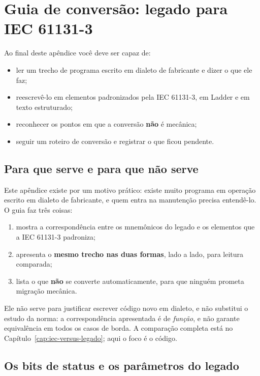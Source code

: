 \chapter{Guia de conversão: legado para IEC 61131-3}
\label{apB}

\begin{objetivos}
Ao final deste apêndice você deve ser capaz de:
\begin{itemize}
  \item ler um trecho de programa escrito em dialeto de fabricante e dizer o que ele faz;
  \item reescrevê-lo em elementos padronizados pela IEC 61131-3, em Ladder e em texto estruturado;
  \item reconhecer os pontos em que a conversão \textbf{não} é mecânica;
  \item seguir um roteiro de conversão e registrar o que ficou pendente.
\end{itemize}
\end{objetivos}

\section{Para que serve e para que não serve}

Este apêndice existe por um motivo prático: existe muito programa em operação escrito em dialeto de
fabricante, e quem entra na manutenção precisa entendê-lo. O guia faz três coisas:

\begin{enumerate}
  \item mostra a correspondência entre os mnemônicos do legado e os elementos que a
        IEC 61131-3 padroniza;
  \item apresenta o \textbf{mesmo trecho nas duas formas}, lado a lado, para leitura comparada;
  \item lista o que \textbf{não} se converte automaticamente, para que ninguém prometa migração
        mecânica.
\end{enumerate}

Ele não serve para justificar escrever código novo em dialeto, e não substitui o estudo da norma: a
correspondência apresentada é de \emph{função}, e não garante equivalência em todos os casos de
borda. A comparação completa está no Capítulo~\ref{cap:iec-versus-legado}; aqui o foco é o código.


\section{Os bits de status e os parâmetros do legado}

